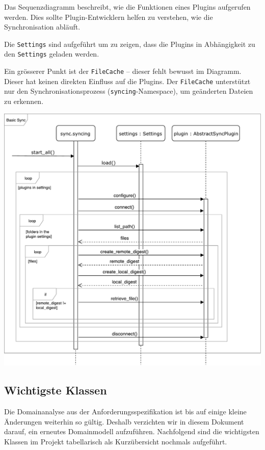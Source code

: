 \documentclass[a4paper]{article}
\begin{document}
Das Sequenzdiagramm beschreibt, wie die Funktionen eines Plugins aufgerufen werden.
Dies sollte Plugin-Entwicklern helfen zu verstehen, wie die Synchronisation abläuft.

Die \verb|Settings| sind aufgeführt um zu zeigen, dass die Plugins in Abhängigkeit zu den \verb|Settings| geladen werden.

Ein grösserer Punkt ist der \verb|FileCache| -- dieser fehlt bewusst im Diagramm.
Dieser hat keinen direkten Einfluss auf die Plugins.
Der \verb|FileCache| unterstützt nur den Synchronisationsprozess (\verb|syncing|-Namespace), um geänderten Dateien zu erkennen.

\includegraphics[width=40em]{./img/GrobesSequenzDiagramm.pdf}

\pagebreak
\subsection{Wichtigste Klassen}

Die Domainanalyse aus der Anforderungsspezifikation ist bis auf einige kleine
Änderungen weiterhin so gültig. Deshalb verzichten wir in diesem Dokument
darauf, ein erneutes Domainmodell aufzuführen. Nachfolgend sind die wichtigsten
Klassen im Projekt tabellarisch als Kurzübersicht nochmals aufgeführt.
\end{document}
